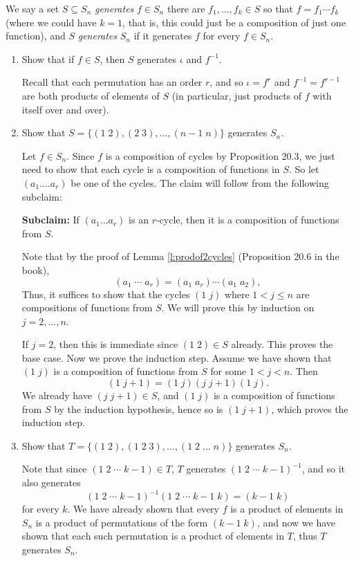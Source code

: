 \documentclass[11pt,dvipsnames]{book}
\numberwithin{figure}{section} %
\numberwithin{table}{section} %
\begin{document}
\begin{exercise} We say a set $S\subseteq S_n$ {\it generates} $f\in S_{n}$ there are $f_{1},...,f_{k}\in S$ so that $f=f_{1}\cdots f_{k}$ (where we could have $k=1$, that is, this could just be a composition of just one function), and $S$ {\it generates} $S_{n}$ if it generates $f$ for every $f\in S_{n}$.

\begin{enumerate}
\item Show that if $f\in S$, then $S$ generates $\iota$ and $f^{-1}$.
\begin{solution}
Recall that each permutation has an order $r$, and so $\iota = f^{r}$ and $f^{-1} = f^{r-1}$ are both products of elements of $S$ (in particular, just products of $f$ with itself over and over). 
\end{solution}
\item Show that $S=\{ (1\; 2), (2 \; 3),...,(n-1 \; n)\}$ generates $S_{n}$. 
\begin{solution}
Let $f\in S_{n}$. Since $f$ is a composition of cycles by Proposition 20.3, we just need to show that each cycle is a composition of functions in $S$. So let $(a_{1}....a_{r})$ be one of the cycles. The claim will follow from the following subclaim:

{\bf Subclaim:} If $(a_{1}...a_{r})$ is an $r$-cycle, then it is a composition of functions from $S$.
 
Note that by the proof of Lemma \ref{l:prodof2cycles} (Proposition 20.6 in the book),
\[
(a_{1}\; \cdots \; a_{r}) = (a_{1} \; a_{r})\cdots (a_{1}\; a_{2}),
\]
Thus, it suffices to show that the cycles $(1 \; j)$ where $1<j\leq n$ are compositions of functions from $S$. We will prove this by induction on $j=2,...,n$.

If $j=2$, then this is immediate since $(1\;2)\in S$ already. This proves the base case. Now we prove the induction step. Assume we have shown that $(1\; j)$ is a composition of functions from $S$ for some $1<j<n$. Then
\[
(1 \; j+1) = (1 \; j)(j\; j+1)(1 \; j).
\]
We already have $(j\; j+1)\in S$, and $(1\; j)$ is a composition of functions from $S$ by the induction hypothesis, hence so is $(1 \; j+1)$, which proves the induction step. 
\end{solution}
\item Show that $T=\{(1\; 2),(1\; 2 \; 3),..., (1 \; 2 \; ...\; n)\}$ generates $S_{n}$.




\begin{solution}
Note that since $(1 \; 2 \; \cdots \; k-1 )\in T$, $T$ generates $(1 \; 2 \; \cdots \; k-1 )^{-1}$, and so it also generates
\[
(1 \; 2 \; \cdots \; k-1 )^{-1} (1 \; 2 \; \cdots \; k-1 \; k)  
=(k-1 \; k)
\]
for every $k$. We have already shown that every $f$ is a product of elements in $S_{n}$ is a product of permutations of the form $(k-1\; k)$, and now we have shown that each such permutation is a product of elements in $T$, thus $T$ generates $S_n$.
\end{solution}


\end{enumerate}
\end{exercise}
\end{document}
